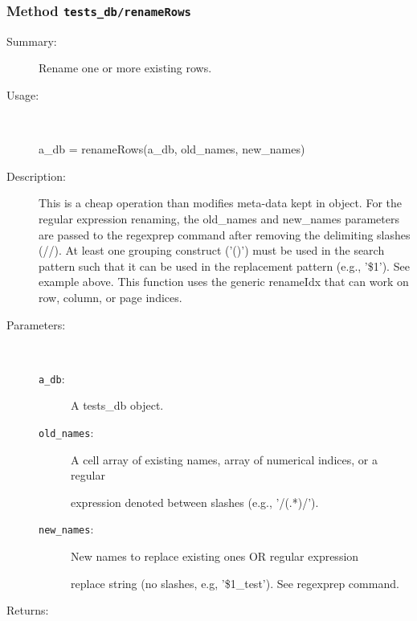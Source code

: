 \subsubsection[Method \texttt{renameRows}]{Method \texttt{tests\_db/renameRows}}%
%
\label{ref_tests_db__renameRows}%
\hypertarget{ref_tests_db__renameRows}{}%
\begin{description}
\item[Summary:]Rename one or more existing rows.
%
\item[Usage:]~%
\begin{lyxcode}%
a\_db = renameRows(a\_db, old\_names, new\_names)
%
\end{lyxcode}%
%
\item[Description:]%
This is a cheap operation than modifies meta-data kept in object. For
 the regular expression renaming, the old\_names and new\_names
 parameters are passed to the regexprep command after removing the
 delimiting slashes (//). At least one grouping construct ('()') must be
 used in the search pattern such that it can be used in the replacement
 pattern (e.g., '\$1'). See example above. This function uses the generic
 renameIdx that can work on row, column, or page indices.
\item[Parameters:]~
\begin{description}%
\item[\texttt{a\_db}:]
 A tests\_db object.
\item[\texttt{old\_names}:]
 A cell array of existing names, array of numerical indices, or a regular

expression denoted between slashes (e.g., '/(.*)/').
\item[\texttt{new\_names}:]
 New names to replace existing ones OR regular expression

replace string (no slashes, e.g, '\$1\_test'). See regexprep command.
\end{description}%
%
\item[Returns:
]~


\end{description}
